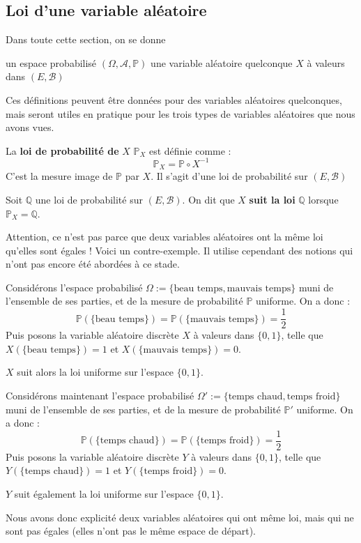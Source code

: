 \documentclass[../integ-proba.tex]{subfiles}
\begin{document}
\subsection{Loi d'une variable aléatoire}

Dans toute cette section, on se donne
\begin{itemize}
    \itemb un espace probabilisé $\left(\Omega, \mathcal{A}, \mathbb{P}\right)$
    \itemb une variable aléatoire quelconque $X$ à valeurs dans $\left(E, \mathcal{B}\right)$
\end{itemize}

Ces définitions peuvent être données pour des variables aléatoires quelconques, mais seront utiles en pratique pour les trois types de variables aléatoires que nous avons vues.

\begin{defi}
    La \textbf{loi de probabilité de} $X$ $\mathbb{P}_X$ est définie comme :
    $$
    \mathbb{P}_X=\mathbb{P} \circ X^{-1}
    $$
    C'est la mesure image de $\mathbb{P}$ par $X$.
    Il s'agit d'une loi de probabilité sur $\left(E, \mathcal{B} \right)$
\end{defi}

\begin{defi}
    Soit $\mathbb{Q}$ une loi de probabilité sur $\left(E, \mathcal{B} \right)$.
    On dit que $X$ \textbf{suit la loi} $\mathbb{Q}$ lorsque $\mathbb{P}_X = \mathbb{Q}$.
\end{defi}

\begin{rem}
    Attention, ce n'est pas parce que deux variables aléatoires ont la même loi qu'elles sont égales !
    Voici un contre-exemple. Il utilise cependant des notions qui n'ont pas encore été abordées à ce stade.
    
    Considérons l'espace probabilisé $\Omega := \{\text{beau temps}, \text{mauvais temps}\}$ muni de l'ensemble de ses parties, et de la mesure de probabilité $\mathbb{P}$ uniforme.
    On a donc :
    $$
    \mathbb{P}(\{\text{beau temps}\}) = \mathbb{P}(\{\text{mauvais temps}\}) = \frac{1}{2}
    $$
    Puis posons la variable aléatoire discrète $X$ à valeurs dans $\{0,1\}$, telle que $X(\{\text{beau temps}\})=1$ et $X(\{\text{mauvais temps}\})=0$.
    
    $X$ suit alors la loi uniforme sur l'espace $\{0,1\}$.

    Considérons maintenant l'espace probabilisé $\Omega' := \{\text{temps chaud}, \text{temps froid}\}$ muni de l'ensemble de ses parties, et de la mesure de probabilité $\mathbb{P}'$ uniforme.
    On a donc :
    $$
    \mathbb{P}(\{\text{temps chaud}\}) = \mathbb{P}(\{\text{temps froid}\}) = \frac{1}{2}
    $$
    Puis posons la variable aléatoire discrète $Y$ à valeurs dans $\{0,1\}$, telle que $Y(\{\text{temps chaud}\})=1$ et $Y(\{\text{temps froid}\})=0$.

    $Y$ suit également la loi uniforme sur l'espace $\{0,1\}$.

    Nous avons donc explicité deux variables aléatoires qui ont même loi, mais qui ne sont pas égales (elles n'ont pas le même espace de départ).
\end{rem}
\end{document}
